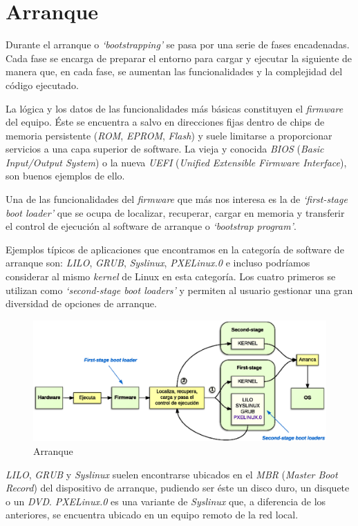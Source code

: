 \documentclass[a4paper,12pt,spanish,final]{epsc_tfc_pfc}
\begin{document}
\section{Arranque}
Durante el arranque o \emph{`bootstrapping'} se pasa por una serie de fases encadenadas. Cada fase se encarga de preparar el entorno para cargar y ejecutar la siguiente de manera que, en cada fase, se aumentan las funcionalidades y la complejidad del código ejecutado.

La lógica y los datos de las funcionalidades más básicas constituyen el \emph{firmware} del equipo. Éste se encuentra a salvo en direcciones fijas dentro de chips de memoria persistente (\emph{ROM}, \emph{EPROM}, \emph{Flash}) y suele limitarse a proporcionar servicios a una capa superior de software. La vieja y conocida \emph{BIOS} (\emph{Basic Input/Output System}) o la nueva \emph{UEFI} (\emph{Unified Extensible Firmware Interface}), son buenos ejemplos de ello.

Una de las funcionalidades del \emph{firmware} que más nos interesa es la de \emph{`first-stage boot loader'} que se ocupa de localizar, recuperar, cargar en memoria y transferir el control de ejecución al software de arranque o \emph{`bootstrap program'}.

Ejemplos típicos de aplicaciones que encontramos en la categoría de software de arranque son: \emph{LILO}, \emph{GRUB}, \emph{Syslinux}, \emph{PXELinux.0} e incluso podríamos considerar al mismo \emph{kernel} de Linux en esta categoría. Los cuatro primeros se utilizan como \emph{`second-stage boot loaders'} y permiten al usuario gestionar una gran diversidad de opciones de arranque.

\begin{figure}[h]
  \centering
    \includegraphics[scale=0.9]{arranque}
      \caption{Arranque}
\end{figure}

\emph{LILO}, \emph{GRUB} y \emph{Syslinux} suelen encontrarse ubicados en el \emph{MBR} (\emph{Master Boot Record}) del dispositivo de arranque, pudiendo ser éste un disco duro, un disquete o un \emph{DVD}. \emph{PXELinux.0} es una variante de \emph{Syslinux} que, a diferencia de los anteriores, se encuentra ubicado en un equipo remoto de la red local.
\end{document}
